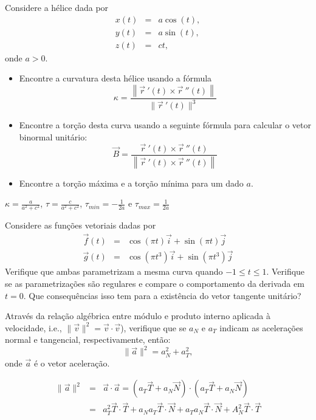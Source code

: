\begin{exer} Considere a hélice dada por
\begin{eqnarray*}
x(t)&=&a\cos(t),\\
y(t)&=&a\sin(t),\\
z(t)&=&ct,
\end{eqnarray*}
onde $a>0$.
\begin{itemize}
\item[a)] Encontre  a curvatura desta hélice usando a fórmula
$$\kappa=\frac{\left\|\vec{r}~\!'(t)\times \vec{r}~\!''(t)\right\|}{\|\vec{r}~\!'(t)\|^3}$$
\item[b)] Encontre a torção desta curva usando a seguinte fórmula para calcular o vetor binormal unitário: $$\vec{B}=\frac{\vec{r}~\!'(t)\times \vec{r}~\!''(t)}{\left\|\vec{r}~\!'(t)\times \vec{r}~\!''(t)\right\|}$$
\item[c)] Encontre a torção máxima e a torção mínima para um dado $a$.
\end{itemize}
\end{exer}
\begin{resp}
 $\kappa= \frac{a}{a^2+c^2}$, $\tau = \frac{c}{a^2+c^2}$, $\tau_{min} = -\frac{1}{2a}$ e $\tau_{max} = \frac{1}{2a}$
\end{resp}


\begin{exer}
Considere as funções vetoriais dadas por
\begin{eqnarray*}
\vec{f}(t)&=&\cos(\pi t)\vec{i}+\sin(\pi t)\vec{j}\\
\vec{g}(t)&=&\cos(\pi t^3)\vec{i}+\sin(\pi t^3)\vec{j}
\end{eqnarray*}
Verifique que ambas parametrizam a mesma curva quando $-1\leq t \leq 1$. Verifique se as parametrizações são regulares e compare o comportamento da derivada em $t=0$. Que consequências isso tem para a existência do vetor tangente unitário?
\end{exer}



\begin{exer} Através da relação algébrica entre módulo e produto interno aplicada à velocidade, i.e., $\|\vec{v}\|^2=\vec{v}\cdot\vec{v}$), verifique que se $a_N$ e $a_T$ indicam as acelerações normal e tangencial, respectivamente, então:
$$\|\vec{a}\|^2=a_N^2+a_T^2,$$
onde $\vec{a}$ é o vetor aceleração.
\end{exer}
\begin{resp}
 \begin{eqnarray}
\|\vec{a}\|^2&=&\vec{a}\cdot\vec{a}=\left(a_T\vec{T}+a_N\vec{N}\right)\cdot\left(a_T\vec{T}+a_N\vec{N}\right)\\
&=&a_T^2\vec{T}\cdot\vec{T}+a_Na_T\vec{T}\cdot\vec{N}+a_Ta_N\vec{T}\cdot\vec{N}+A_N^2\vec{T}\cdot\vec{T}
 \end{eqnarray}
\end{resp}


